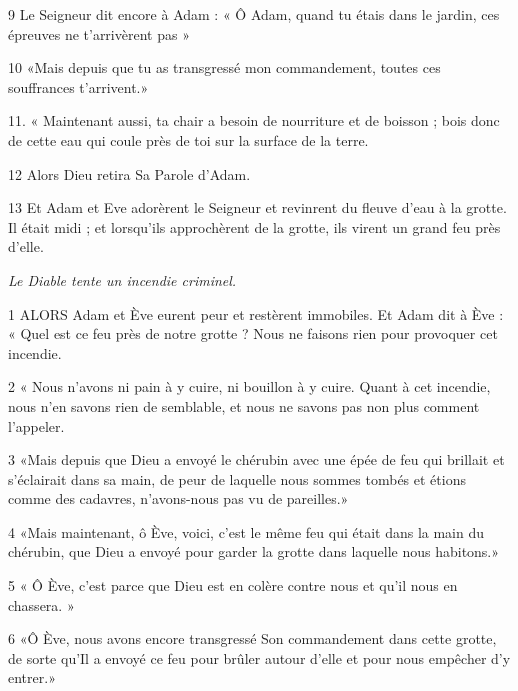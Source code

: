 \par 9 Le Seigneur dit encore à Adam : « Ô Adam, quand tu étais dans le jardin, ces épreuves ne t'arrivèrent pas »

\par 10 «Mais depuis que tu as transgressé mon commandement, toutes ces souffrances t'arrivent.»

\par 11. « Maintenant aussi, ta chair a besoin de nourriture et de boisson ; bois donc de cette eau qui coule près de toi sur la surface de la terre.

\par 12 Alors Dieu retira Sa Parole d'Adam.

\par 13 Et Adam et Eve adorèrent le Seigneur et revinrent du fleuve d'eau à la grotte. Il était midi ; et lorsqu'ils approchèrent de la grotte, ils virent un grand feu près d'elle.


\par \textit{Le Diable tente un incendie criminel.}

\par 1 ALORS Adam et Ève eurent peur et restèrent immobiles. Et Adam dit à Ève : « Quel est ce feu près de notre grotte ? Nous ne faisons rien pour provoquer cet incendie.

\par 2 « Nous n'avons ni pain à y cuire, ni bouillon à y cuire. Quant à cet incendie, nous n’en savons rien de semblable, et nous ne savons pas non plus comment l’appeler.

\par 3 «Mais depuis que Dieu a envoyé le chérubin avec une épée de feu qui brillait et s'éclairait dans sa main, de peur de laquelle nous sommes tombés et étions comme des cadavres, n'avons-nous pas vu de pareilles.»

\par 4 «Mais maintenant, ô Ève, voici, c'est le même feu qui était dans la main du chérubin, que Dieu a envoyé pour garder la grotte dans laquelle nous habitons.»

\par 5 « Ô Ève, c'est parce que Dieu est en colère contre nous et qu'il nous en chassera. »

\par 6 «Ô Ève, nous avons encore transgressé Son commandement dans cette grotte, de sorte qu'Il a envoyé ce feu pour brûler autour d'elle et pour nous empêcher d'y entrer.»

